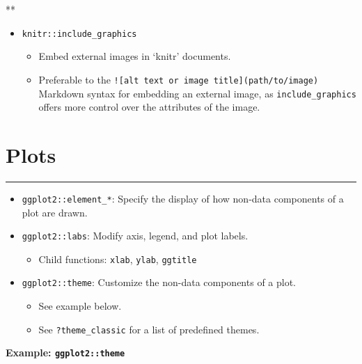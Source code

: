 \documentclass[
]{book}
\providecommand{\tightlist}{%
  \setlength{\itemsep}{0pt}\setlength{\parskip}{0pt}}
\begin{document}
**

\begin{itemize}
\tightlist
\item
  \texttt{knitr::include\_graphics}

  \begin{itemize}
  \tightlist
  \item
    Embed external images in `knitr' documents.
  \item
    Preferable to the \texttt{!{[}alt\ text\ or\ image\ title{]}(path/to/image)} Markdown syntax for embedding an external image, as \texttt{include\_graphics} offers more control over the attributes of the image.
  \end{itemize}
\end{itemize}

\hypertarget{plots}{%
\section{Plots}\label{plots}}

\begin{center}\rule{0.5\linewidth}{0.5pt}\end{center}

\begin{itemize}
\tightlist
\item
  \texttt{ggplot2::element\_*}: Specify the display of how non-data components of a plot are drawn.
\item
  \texttt{ggplot2::labs}: Modify axis, legend, and plot labels.

  \begin{itemize}
  \tightlist
  \item
    Child functions: \texttt{xlab}, \texttt{ylab}, \texttt{ggtitle}
  \end{itemize}
\item
  \texttt{ggplot2::theme}: Customize the non-data components of a plot.

  \begin{itemize}
  \tightlist
  \item
    See example below.
  \item
    See \texttt{?theme\_classic} for a list of predefined themes.
  \end{itemize}
\end{itemize}

\textbf{Example: \texttt{ggplot2::theme}}
\end{document}
